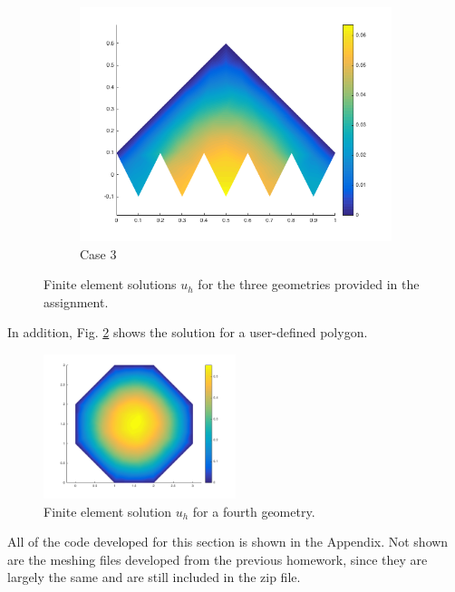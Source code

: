 \documentclass[10pt]{article}
\begin{document}
\begin{figure}[H]
\begin{subfigure}[b]{0.35\textwidth}
                \includegraphics[width=\textwidth]{case3.png}
                \caption{Case 3}
        \end{subfigure}%
        \caption{Finite element solutions \(u_h\) for the three geometries provided in the assignment.}
        \label{fig:5}
\end{figure}

In addition, Fig. \ref{fig:10} shows the solution for a user-defined polygon. 

\begin{figure}[H]
\centering
\includegraphics[width=0.5\textwidth]{case4.png}
\caption{Finite element solution \(u_h\) for a fourth geometry.}
\label{fig:10}
\end{figure}

All of the code developed for this section is shown in the Appendix. Not shown are the meshing files developed from the previous homework, since they are largely the same and are still included in the zip file.

\section{}
\end{document}

